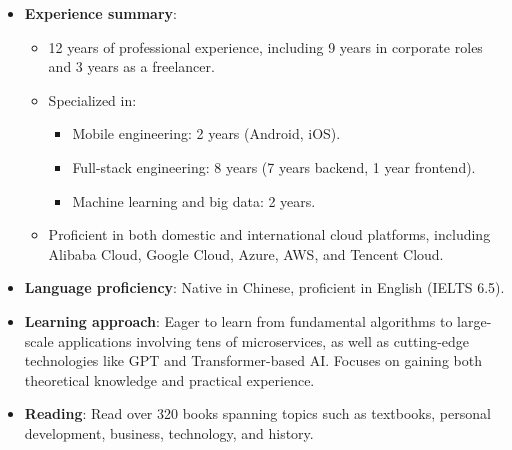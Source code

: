 \documentclass[a4paper,14pt]{article}
\begin{document}
\begin{itemize}
\begin{itemize}
            \item \href{}{Beijing Square Root}: Founded \textit{Fun Live}, a live streaming knowledge platform that attracted 30,000 users within a year. Transitioned to software consulting, managing over 50 projects for clients such as Yuanfudao, Jiangsu TV, Fenbi Education, and Beijing International Studies University. Played dual roles as project manager and software engineer, generating 3 million CNY in revenue and 600,000 CNY in profit.
            \item \href{https://www.leancloud.cn}{LeanCloud}: Responsible for iOS and Android development, focusing on the design and implementation of SDKs of cloud service features, including object storage, file storage, web hosting, containerization, instant messaging, push notifications and SMS services. Improved product integration and operational efficiency across multiple platforms.
        \end{itemize}
    \item \textbf{Experience summary}:
        \begin{itemize}
            \item 12 years of professional experience, including 9 years in corporate roles and 3 years as a freelancer.
            \item Specialized in:
            \begin{itemize}
                \item Mobile engineering: 2 years (Android, iOS).
                \item Full-stack engineering: 8 years (7 years backend, 1 year frontend).
                \item Machine learning and big data: 2 years.
            \end{itemize}
            \item Proficient in both domestic and international cloud platforms, including Alibaba Cloud, Google Cloud, Azure, AWS, and Tencent Cloud.
        \end{itemize}
    \item \textbf{Language proficiency}: Native in Chinese, proficient in English (IELTS 6.5).
    \item \textbf{Learning approach}: Eager to learn from fundamental algorithms to large-scale applications involving tens of microservices, as well as cutting-edge technologies like GPT and Transformer-based AI. Focuses on gaining both theoretical knowledge and practical experience.
    \item \textbf{Reading}: Read over 320 books spanning topics such as textbooks, personal development, business, technology, and history.

\end{itemize}
\end{document}
